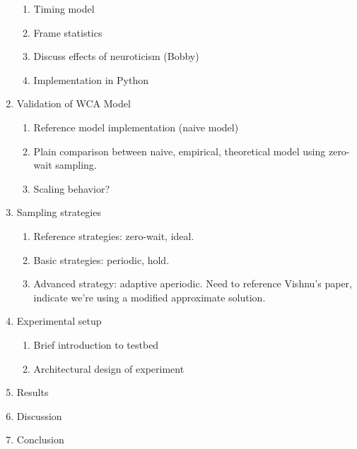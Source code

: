 \begin{enumerate}
\begin{enumerate}
            \item Timing model
            \item Frame statistics
            \item Discuss effects of neuroticism (Bobby)
            \item Implementation in Python
        \end{enumerate}
    \item Validation of WCA Model
    \begin{enumerate}
        \item Reference model implementation (naive model)
        \item Plain comparison between naive, empirical, theoretical model using zero-wait sampling.
        \item Scaling behavior? 
    \end{enumerate}
    
    \item Sampling strategies
    \begin{enumerate}
        \item Reference strategies: zero-wait, ideal.
        \item Basic strategies: periodic, hold.
        \item Advanced strategy: adaptive aperiodic. Need to reference Vishnu's paper, indicate we're using a modified approximate solution.
    \end{enumerate}

    \item Experimental setup
    \begin{enumerate}
        \item Brief introduction to testbed
        \item Architectural design of experiment
    \end{enumerate}

    \item Results
    \item Discussion
    \item Conclusion
\end{enumerate}
\newpage